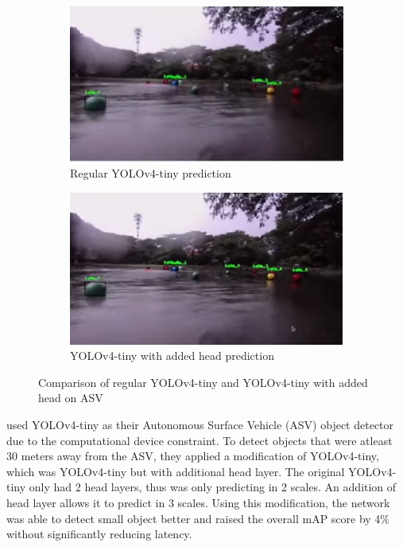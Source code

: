   \begin{figure}[H]
    \hfill%
    \begin{subfigure}[c][][c]{.45\textwidth}
        \includegraphics[width=1\linewidth]{figures/yolov4barun-regular.png}
        \caption{Regular YOLOv4-tiny prediction}
        \label{fig:barun-yolov4}
    \end{subfigure}\hfill  
    \begin{subfigure}[c][][c]{.45\textwidth}
        \includegraphics[width=1\linewidth]{figures/yolov4barun-addhead.png}
        \caption{YOLOv4-tiny with added head prediction}
        \label{fig:barun-yolov4-3l}
    \end{subfigure}\hfill%
    \caption{Comparison of regular YOLOv4-tiny and YOLOv4-tiny with added head on \textcite{barunastra} ASV}
    \label{fig:barun}
  \end{figure}

  \textcite{barunastra} used YOLOv4-tiny as their Autonomous Surface Vehicle (ASV) object detector due to the computational
  device constraint.
  To detect objects that were atleast 30 meters away from the ASV, they applied a modification of YOLOv4-tiny, which was YOLOv4-tiny
  but with additional head layer. The original YOLOv4-tiny only had 2 head layers, thus was only predicting in 2 scales.
  An addition of head layer allows it to predict in 3 scales. Using this modification, the network was able to detect small object
  better and raised the overall mAP score by 4\% without significantly reducing latency.

